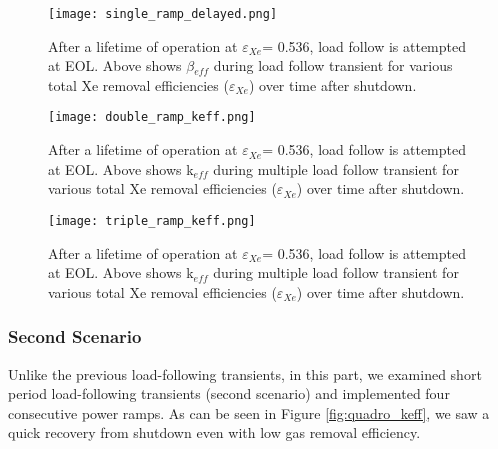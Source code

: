     \begin{figure}[htbp!]
        \begin{center}
            \texttt{[image: single\_ramp\_delayed.png]}
        \end{center}
        \caption{After a lifetime of operation at $\varepsilon$$_{Xe}$= 0.536, 
            load follow is attempted at EOL. Above shows $\beta$$_{eff}$ during 
            load
        follow transient for various total Xe removal efficiencies
        ($\varepsilon$$_{Xe}$) over time after shutdown.}
        \label{fig:single_delayed}
    \end{figure}

    \begin{figure}[htbp!]
        \begin{center}
            \texttt{[image: double\_ramp\_keff.png]}
        \end{center}
        \caption{After a lifetime of operation at $\varepsilon$$_{Xe}$= 0.536, 
            load follow is attempted at EOL. Above shows k$_{eff}$ during 
            multiple load follow transient for various total Xe removal 
            efficiencies
        ($\varepsilon$$_{Xe}$) over time after shutdown.}
        \label{fig:double_keff}
    \end{figure}

    \begin{figure}[htbp!]
        \begin{center}
            \texttt{[image: triple\_ramp\_keff.png]}
        \end{center}
        \caption{After a lifetime of operation at $\varepsilon$$_{Xe}$= 0.536, 
            load follow is attempted at EOL. Above shows  k$_{eff}$ during 
            multiple load follow transient for various total Xe removal 
            efficiencies
        ($\varepsilon$$_{Xe}$) over time after shutdown.}
        \label{fig:triple_keff}
    \end{figure}

\FloatBarrier

\subsubsection{Second Scenario}

    Unlike the previous load-following transients, in this part, we examined short 
    period load-following transients (second scenario) and implemented four 
    consecutive power ramps. As can be seen in Figure \ref{fig:quadro_keff}, we 
    saw a quick recovery from shutdown even with low gas removal efficiency.

